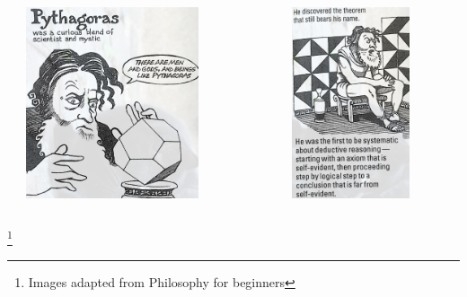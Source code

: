 \documentclass[unicode, 14pt, aspectratio=169]{beamer}
\newcommand\blfootnote[1]{%
  \begingroup
  \renewcommand\thefootnote{}\footnote{#1}%
  \addtocounter{footnote}{-1}%
  \endgroup
}
\begin{document}
\begin{frame}
\begin{columns}
\begin{column}{0.25\textwidth}
\begin{center}
    \end{center}
  \end{column}
  \begin{column}{0.25\textwidth}
    \begin{center}
      \includegraphics[width=0.7\textwidth]{images/pythagoras.png}
    \end{center}
  \end{column}
  \begin{column}{0.25\textwidth}
    \begin{center}
      \includegraphics[width=0.7\textwidth]{images/pythagoras2.png}
    \end{center}
  \end{column}  
\end{columns}
\blfootnote{Images adapted from Philosophy for beginners\supercite{philosophy-for-begginers}}
\end{frame}
\end{document}
